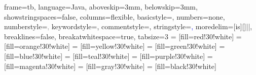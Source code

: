 \usepackage{hyperref}
\usepackage{listings}
\usepackage{color}
\usepackage[dvipsnames]{xcolor}
\usepackage{float}
\usepackage{graphicx}
\usepackage{tikz,tikz-dependency}
\usepackage{ifthen}
\usetikzlibrary{calc}
\usetikzlibrary{automata,positioning,external,shapes,arrows,chains,matrix,scopes,backgrounds}

\makeatletter
{}
\makeatother

\makeatletter
\renewcommand\thesection{}
\renewcommand\thesubsection{}
\makeatother

 {
  frame=tb,
  language=Java,
  aboveskip=3mm,
  belowskip=3mm,
  showstringspaces=false,
  columns=flexible,
  basicstyle={\large\ttfamily},
  numbers=none,
  numberstyle=\textcolor{gray},
  keywordstyle=\textcolor{red!75},
  commentstyle=\textcolor{dkgreen},
  stringstyle=\textcolor{blue},
  moredelim=[is][\textcolor{black!75}]{|}{|},
  breaklines=false,
  breakatwhitespace=true,
  tabsize=3
}
     = [fill=red!30!white]
  = [fill=orange!30!white]
  = [fill=yellow!30!white]
   = [fill=green!30!white]
    = [fill=blue!30!white]
    = [fill=teal!30!white]
  = [fill=purple!30!white]
 = [fill=magenta!30!white]
    = [fill=gray!30!white]
   = [fill=black!30!white]


